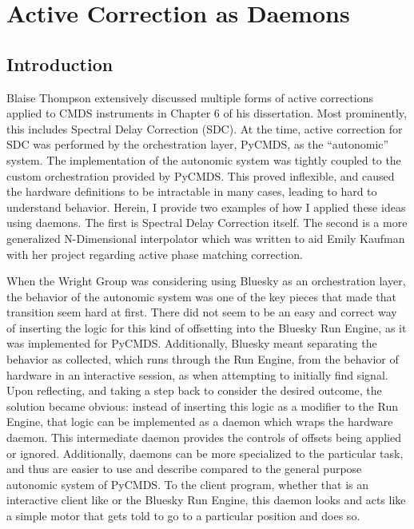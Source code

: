 \chapter{Active Correction as Daemons} \label{cha:act_corr}

\clearpage

\section{Introduction}  %

Blaise Thompson extensively discussed multiple forms of active corrections applied to CMDS instruments in Chapter 6 of his dissertation\cite{ThompsonBlaiseJonathan2018a}.
Most prominently, this includes Spectral Delay Correction (SDC).
At the time, active correction for SDC was performed by the orchestration layer, PyCMDS, as the ``autonomic'' system.
The implementation of the autonomic system was tightly coupled to the custom orchestration provided by PyCMDS.
This proved inflexible, and caused the hardware definitions to be intractable in many cases, leading to hard to understand behavior.
Herein, I provide two examples of how I applied these ideas using \yaq{} daemons.
The first is Spectral Delay Correction itself.
The second is a more generalized N-Dimensional interpolator which was written to aid Emily Kaufman with her project regarding active phase matching correction.

When the Wright Group was considering using Bluesky as an orchestration layer, the behavior of the autonomic system was one of the key pieces that made that transition seem hard at first.
There did not seem to be an easy and correct way of inserting the logic for this kind of offsetting into the Bluesky Run Engine, as it was implemented for PyCMDS.
Additionally, Bluesky meant separating the behavior as collected, which runs through the Run Engine, from the behavior of hardware in an interactive session, as when attempting to initially find signal.
Upon reflecting, and taking a step back to consider the desired outcome, the solution became obvious: instead of inserting this logic as a modifier to the Run Engine, that logic can be implemented as a daemon which wraps the hardware daemon.
This intermediate daemon provides the controls of offsets being applied or ignored.
Additionally, daemons can be more specialized to the particular task, and thus are easier to use and describe compared to the general purpose autonomic system of PyCMDS.
To the client program, whether that is an interactive client like \yaqcqtpy{} or the Bluesky Run Engine, this daemon looks and acts like a simple motor that gets told to go to a particular position and does so.

